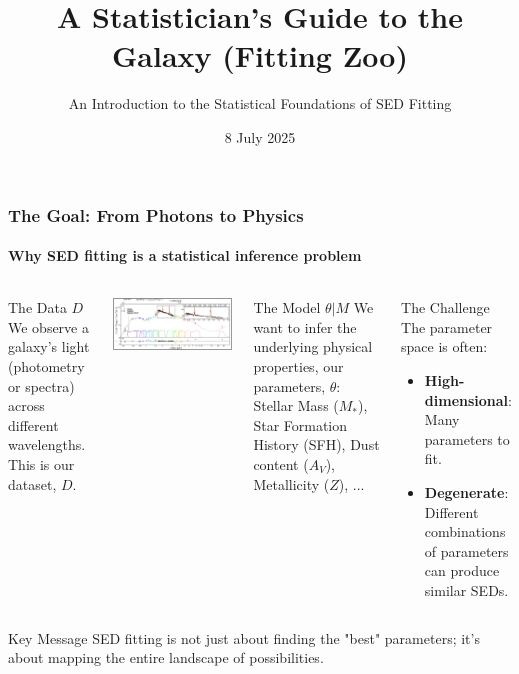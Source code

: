 \documentclass[aspectratio=169]{beamer}
\title{A Statistician's Guide to the Galaxy (Fitting Zoo)}
\subtitle{An Introduction to the Statistical Foundations of SED Fitting}
\date{8 July 2025}
\newcommand{\keyterm}[1]{\textbf{\textcolor{C0}{#1}}}
\begin{document}
\begin{frame}
    \titlepage
\end{frame}

\begin{frame}
    \frametitle{The Goal: From Photons to Physics}
    \framesubtitle{Why SED fitting is a statistical inference problem}
    \begin{columns}[T]
        \begin{block}{The Data $D$}
            We observe a galaxy's light (photometry or spectra) across different wavelengths. This is our dataset, $D$.
        \end{block}
        \includegraphics[width=\textwidth]{figures/sed.png}
        
        \begin{block}{The Model $\theta|M$}
            We want to infer the underlying physical properties, our parameters, $\theta$: Stellar Mass ($M_*$), Star Formation History (SFH), Dust content ($A_V$), Metallicity ($Z$), ...
        \end{block}
        \begin{block}{The Challenge}
            The parameter space is often:
            \begin{itemize}
                \item \keyterm{High-dimensional}: Many parameters to fit.
                \item \keyterm{Degenerate}: Different combinations of parameters can produce similar SEDs.
            \end{itemize}
        \end{block}
    \end{columns}
    \vspace{1em}
    \begin{alertblock}{Key Message}
        SED fitting is not just about finding the "best" parameters; it's about mapping the entire landscape of possibilities.
    \end{alertblock}
\end{frame}
\end{document}
